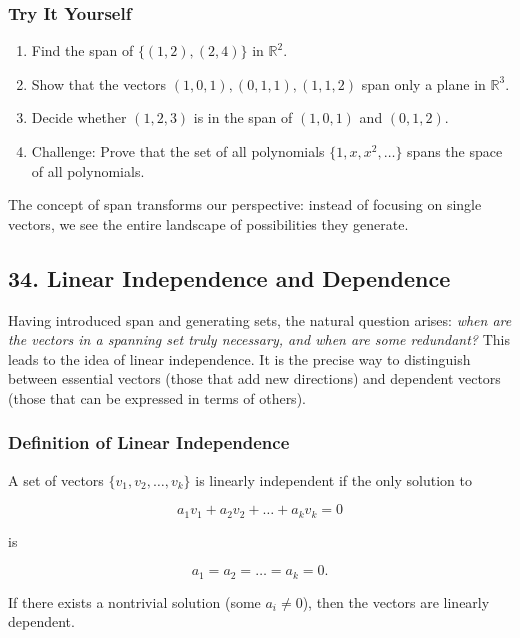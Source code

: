 \documentclass[
  letterpaper,
  DIV=11,
  numbers=noendperiod]{scrreprt}
\providecommand{\tightlist}{%
  \setlength{\itemsep}{0pt}\setlength{\parskip}{0pt}}
\begin{document}
\subsubsection{Try It Yourself}\label{try-it-yourself-32}

\begin{enumerate}
\def\labelenumi{\arabic{enumi}.}
\tightlist
\item
  Find the span of \(\{(1,2), (2,4)\}\) in \(\mathbb{R}^2\).
\item
  Show that the vectors \((1,0,1), (0,1,1), (1,1,2)\) span only a plane
  in \(\mathbb{R}^3\).
\item
  Decide whether \((1,2,3)\) is in the span of \((1,0,1)\) and
  \((0,1,2)\).
\item
  Challenge: Prove that the set of all polynomials
  \(\{1, x, x^2, \dots\}\) spans the space of all polynomials.
\end{enumerate}

The concept of span transforms our perspective: instead of focusing on
single vectors, we see the entire landscape of possibilities they
generate.

\subsection{34. Linear Independence and
Dependence}\label{linear-independence-and-dependence}

Having introduced span and generating sets, the natural question arises:
\emph{when are the vectors in a spanning set truly necessary, and when
are some redundant?} This leads to the idea of linear independence. It
is the precise way to distinguish between essential vectors (those that
add new directions) and dependent vectors (those that can be expressed
in terms of others).

\subsubsection{Definition of Linear
Independence}\label{definition-of-linear-independence}

A set of vectors \(\{v_1, v_2, \dots, v_k\}\) is linearly independent if
the only solution to

\[
a_1 v_1 + a_2 v_2 + \dots + a_k v_k = 0
\]

is

\[
a_1 = a_2 = \dots = a_k = 0.
\]

If there exists a nontrivial solution (some \(a_i \neq 0\)), then the
vectors are linearly dependent.
\end{document}
